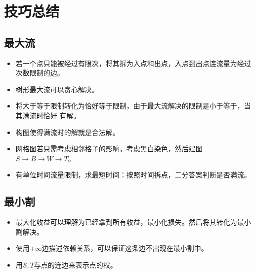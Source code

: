 \section{技巧总结}
\subsection{最大流}
\begin{itemize}
    \item 若一个点只能被经过有限次，将其拆为入点和出点，入点到出点连流量为经过次数限制的边。
    \item 树形最大流可以贪心解决。
    \item 将大于等于限制转化为恰好等于限制，由于最大流解决的限制是小于等于，当其满流时恰好
    有解。
    \item 构图使得满流时的解就是合法解。
    \item 网格图若只需考虑相邻格子的影响，考虑黑白染色，然后建图
    $S\rightarrow B\rightarrow W\rightarrow T$。
    \item 有单位时间流量限制，求最短时间：按照时间拆点，二分答案判断是否满流。
\end{itemize}
\subsection{最小割}
\begin{itemize}
    \item 最大化收益可以理解为已经拿到所有收益，最小化损失。然后将其转化为最小割解决。
    \item 使用$+\infty$边描述依赖关系，可以保证这条边不出现在最小割中。
    \item 用$S,T$与点的连边来表示点的权。
\end{itemize}
